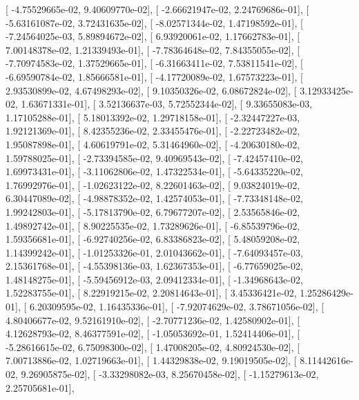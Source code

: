 \documentclass{article}
\begin{document}
       [ -4.75529665e-02,   9.40609770e-02],
       [ -2.66621947e-02,   2.24769686e-01],
       [ -5.63161087e-02,   3.72431635e-02],
       [ -8.02571344e-02,   1.47198592e-01],
       [ -7.24564025e-03,   5.89894672e-02],
       [  6.93920061e-02,   1.17662783e-01],
       [  7.00148378e-02,   1.21339493e-01],
       [ -7.78364648e-02,   7.84355055e-02],
       [ -7.70974583e-02,   1.37529665e-01],
       [ -6.31663411e-02,   7.53811541e-02],
       [ -6.69590784e-02,   1.85666581e-01],
       [ -4.17720089e-02,   1.67573223e-01],
       [  2.93530899e-02,   4.67498293e-02],
       [  9.10350326e-02,   6.08672824e-02],
       [  3.12933425e-02,   1.63671331e-01],
       [  3.52136637e-03,   5.72552344e-02],
       [  9.33655083e-03,   1.17105288e-01],
       [  5.18013392e-02,   1.29718158e-01],
       [ -2.32447227e-03,   1.92121369e-01],
       [  8.42355236e-02,   2.33455476e-01],
       [ -2.22723482e-02,   1.95087898e-01],
       [  4.60619791e-02,   5.31464960e-02],
       [ -4.20630180e-02,   1.59788025e-01],
       [ -2.73394585e-02,   9.40969543e-02],
       [ -7.42457410e-02,   1.69973431e-01],
       [ -3.11062806e-02,   1.47322534e-01],
       [ -5.64335220e-02,   1.76992976e-01],
       [ -1.02623122e-02,   8.22601463e-02],
       [  9.03824019e-02,   6.30447089e-02],
       [ -4.98878352e-02,   1.42574053e-01],
       [ -7.73348148e-02,   1.99242803e-01],
       [ -5.17813790e-02,   6.79677207e-02],
       [  2.53565846e-02,   1.49892742e-01],
       [  8.90225535e-02,   1.73289626e-01],
       [ -6.85539796e-02,   1.59356681e-01],
       [ -6.92740256e-02,   6.83386823e-02],
       [  5.48059208e-02,   1.14399242e-01],
       [ -1.01253326e-01,   2.01043662e-01],
       [ -7.64093457e-03,   2.15361768e-01],
       [ -4.55398136e-03,   1.62367353e-01],
       [ -6.77659025e-02,   1.48148275e-01],
       [ -5.59456912e-03,   2.09412334e-01],
       [ -1.34968643e-02,   1.52283755e-01],
       [  8.22919215e-02,   2.20814643e-01],
       [  3.45336421e-02,   1.25286429e-01],
       [  6.20309595e-02,   1.16435336e-01],
       [ -7.92074629e-02,   3.78671056e-02],
       [  4.80406677e-02,   9.52161910e-02],
       [ -2.70771236e-02,   1.42580902e-01],
       [  4.12628793e-02,   8.46377591e-02],
       [ -1.05053692e-01,   1.52414406e-01],
       [ -5.28616615e-02,   6.75098300e-02],
       [  1.47008205e-02,   4.80924530e-02],
       [  7.00713886e-02,   1.02719663e-01],
       [  1.44329838e-02,   9.19019505e-02],
       [  8.11442616e-02,   9.26905875e-02],
       [ -3.33298082e-03,   8.25670458e-02],
       [ -1.15279613e-02,   2.25705681e-01],
\end{document}
